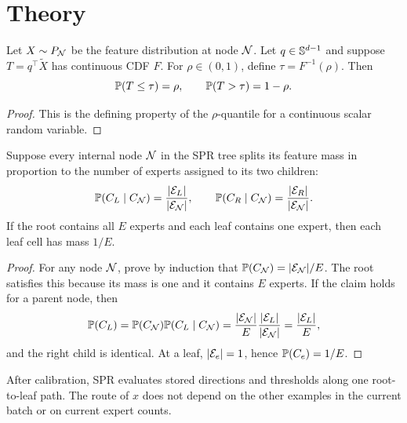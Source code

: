 \section{Theory}

\begin{theorem}
\label{thm:quantile}
Let $X\sim P_{\mathcal{N}}$ be the feature distribution at node $\mathcal{N}$.  Let
$q\in\mathbb{S}^{d-1}$ and suppose $T=q^\top \tilde X$ has continuous CDF $F$.
For $\rho\in(0,1)$, define $\tau=F^{-1}(\rho)$.  Then
\begin{equation}
  \mathbb{P}(T\le \tau)=\rho,\qquad \mathbb{P}(T>\tau)=1-\rho .
\end{equation}
\end{theorem}

\begin{proof}
This is the defining property of the $\rho$-quantile for a continuous scalar
random variable.
\end{proof}

\begin{theorem}
\label{thm:recursive}
Suppose every internal node $\mathcal{N}$ in the SPR tree splits its feature mass in
proportion to the number of experts assigned to its two children:
\begin{equation}
  \mathbb{P}(C_L\mid C_{\mathcal{N}})=\frac{|\mathcal{E}_L|}{|\mathcal{E}_{\mathcal{N}}|},
  \qquad
  \mathbb{P}(C_R\mid C_{\mathcal{N}})=\frac{|\mathcal{E}_R|}{|\mathcal{E}_{\mathcal{N}}|}.
\end{equation}
If the root contains all $E$ experts and each leaf contains one expert, then
each leaf cell has mass $1/E$.
\end{theorem}

\begin{proof}
For any node $\mathcal{N}$, prove by induction that
$\mathbb{P}(C_{\mathcal{N}})=|\mathcal{E}_{\mathcal{N}}|/E$.  The root satisfies this because its
mass is one and it contains $E$ experts.  If the claim holds for a parent node,
then
\begin{equation}
  \mathbb{P}(C_L)
  =\mathbb{P}(C_{\mathcal{N}})\mathbb{P}(C_L\mid C_{\mathcal{N}})
  =\frac{|\mathcal{E}_{\mathcal{N}}|}{E}
   \frac{|\mathcal{E}_L|}{|\mathcal{E}_{\mathcal{N}}|}
  =\frac{|\mathcal{E}_L|}{E},
\end{equation}
and the right child is identical.  At a leaf, $|\mathcal{E}_e|=1$, hence
$\mathbb{P}(C_e)=1/E$.
\end{proof}

\begin{proposition}
After calibration, SPR evaluates stored directions and thresholds along one
root-to-leaf path.  The route of $x$ does not depend on the other examples in
the current batch or on current expert counts.
\end{proposition}

